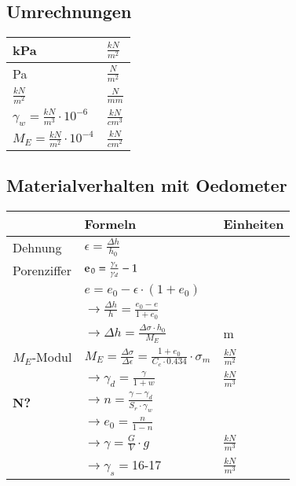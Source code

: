 \begin{minipage}{\linewidth}

	\subsection{Umrechnungen}

	\begin{tabular}{|l|l|}
	\hline
	kPa 				& $\frac{kN}{m^2}$ \\ \hline
	Pa					& $\frac{N}{m^2}$  \\ \hline
	$\frac{kN}{m^2}$	& $\frac{N}{mm}$	\\ \hline
	$\gamma_w=\frac{kN}{m^3}\cdot 10^{-6}$ & $\frac{kN}{cm^3}$ \\ \hline
	$M_E=\frac{kN}{m^2}\cdot 10^{-4}$ & $\frac{kN}{cm^2}$	\\ \hline
	\end{tabular}
	
	
	\subsection{Materialverhalten mit Oedometer}

	\begin{tabular}{l|l|l}
				& Formeln 									& Einheiten \\ \hline \hline
	
		Dehnung &$\epsilon = \frac{\Delta h}{h_0}$& \\ \hline
	
		Porenziffer&$\e_0=\frac{\gamma_s}{\gamma_d} -1$		& \\
				&$e=e_0-\epsilon \cdot \left(1+ e_0\right)$	&\\
				&$\rightarrow\frac{\Delta h}{h}=\frac{e_0 - e}{1+e_0}$&\\	
				&$\rightarrow\Delta h=\frac{\Delta \sigma \cdot h_0}{M_E}$&m \\ \hline
	
		$M_E$-Modul&$M_E=\frac{\Delta \sigma}{\Delta \epsilon}=\frac{1+e_0}{C_c \cdot 0.434}\cdot\sigma_m$&$\frac{kN}{m^2}$ \\	
				&$\rightarrow \gamma_d=\frac{\gamma}{1+w}$	&$\frac{kN}{m^3}$ \\
	\textbf{N?}	&$\rightarrow n=\frac{\gamma-\gamma_d}{S_r\cdot\gamma_w}$& \\
				&$\rightarrow e_0=\frac{n}{1-n}$			& \\
				&$\rightarrow \gamma=\frac{G}{V}\cdot g$	& $\frac{kN}{m^3}$ \\
				&$\rightarrow \gamma_s=$16-17				& $\frac{kN}{m^3}$ \\ \hline


\end{tabular}
\end{minipage}
